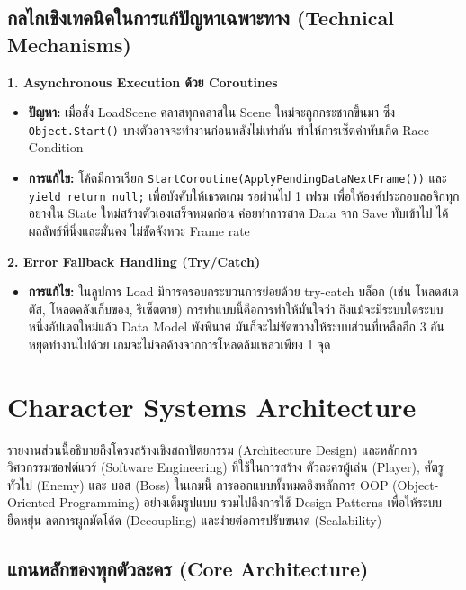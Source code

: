 \subsection{กลไกเชิงเทคนิคในการแก้ปัญหาเฉพาะทาง (Technical Mechanisms)}

\textbf{1. Asynchronous Execution ด้วย Coroutines}

\begin{itemize}
\item \textbf{ปัญหา:} เมื่อสั่ง LoadScene คลาสทุกคลาสใน Scene ใหม่จะถูกกระชากขึ้นมา ซึ่ง \texttt{Object.Start()} บางตัวอาจจะทำงานก่อนหลังไม่เท่ากัน ทำให้การเซ็ตค่าทับเกิด Race Condition
\item \textbf{การแก้ไข:} โค้ดมีการเรียก \texttt{StartCoroutine(ApplyPendingDataNextFrame())} และ \texttt{yield return null;} เพื่อบังคับให้เธรดเกม รอผ่านไป 1 เฟรม เพื่อให้องค์ประกอบลอจิกทุกอย่างใน State ใหม่สร้างตัวเองเสร็จหมดก่อน ค่อยทำการสาด Data จาก Save ทับเข้าไป ได้ผลลัพธ์ที่นิ่งและมั่นคง ไม่ขัดจังหวะ Frame rate
\end{itemize}

\textbf{2. Error Fallback Handling (Try/Catch)}

\begin{itemize}
\item \textbf{การแก้ไข:} ในลูปการ Load มีการครอบกระบวนการย่อยด้วย try-catch บล็อก (เช่น โหลดสเตตัส, โหลดคลังเก็บของ, รีเซ็ตตาย) การทำแบบนี้คือการทำให้มั่นใจว่า ถึงแม้จะมีระบบใดระบบหนึ่งอัปเดตใหม่แล้ว Data Model พังพินาศ มันก็จะไม่ขัดขวางให้ระบบส่วนที่เหลืออีก 3 อันหยุดทำงานไปด้วย เกมจะไม่จอค้างจากการโหลดล้มเหลวเพียง 1 จุด
\end{itemize}

\section{Character Systems Architecture}

รายงานส่วนนี้อธิบายถึงโครงสร้างเชิงสถาปัตยกรรม (Architecture Design) และหลักการวิศวกรรมซอฟต์แวร์ (Software Engineering) ที่ใช้ในการสร้าง ตัวละครผู้เล่น (Player), ศัตรูทั่วไป (Enemy) และ บอส (Boss) ในเกมนี้ การออกแบบทั้งหมดอิงหลักการ OOP (Object-Oriented Programming) อย่างเต็มรูปแบบ รวมไปถึงการใช้ Design Patterns เพื่อให้ระบบยืดหยุ่น ลดการผูกมัดโค้ด (Decoupling) และง่ายต่อการปรับขนาด (Scalability)

\subsection{แกนหลักของทุกตัวละคร (Core Architecture)}


